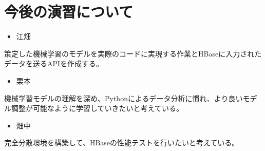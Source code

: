 \documentclass{scrartcl}
\begin{document}
\section{今後の演習について}
\label{sec:orgf289936}
\begin{itemize}
\item 江畑\\
\end{itemize}
策定した機械学習のモデルを実際のコードに実現する作業とHBaseに入力されたデータを送るAPIを作成する。\\
\begin{itemize}
\item 栗本\\
\end{itemize}
機械学習モデルの理解を深め、Pythonによるデータ分析に慣れ、より良いモデル調整が可能なように学習していきたいと考えている。\\
\begin{itemize}
\item 畑中\\
\end{itemize}
完全分散環境を構築して、HBaseの性能テストを行いたいと考えている。\\
\end{document}
